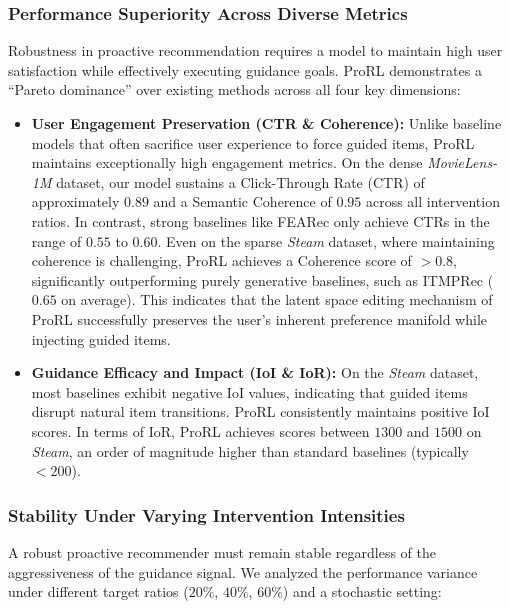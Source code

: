 \subsubsection{Performance Superiority Across Diverse Metrics}
Robustness in proactive recommendation requires a model to maintain high user satisfaction while effectively executing guidance goals. ProRL demonstrates a ``Pareto dominance'' over existing methods across all four key dimensions:

\begin{itemize}
    \item \textbf{User Engagement Preservation (CTR \& Coherence):} 
    Unlike baseline models that often sacrifice user experience to force guided items, ProRL maintains exceptionally high engagement metrics.
    On the dense \textit{MovieLens-1M} dataset, our model sustains a Click-Through Rate (CTR) of approximately $0.89$ and a Semantic Coherence of $0.95$ across all intervention ratios. In contrast, strong baselines like FEARec only achieve CTRs in the range of $ 0.55$ to $0.60$. 
    Even on the sparse \textit{Steam} dataset, where maintaining coherence is challenging, ProRL achieves a Coherence score of $>0.8$, significantly outperforming purely generative baselines, such as ITMPRec ($0.65$ on average). This indicates that the latent space editing mechanism of ProRL successfully preserves the user's inherent preference manifold while injecting guided items.

    \item \textbf{Guidance Efficacy and Impact (IoI \& IoR):} 
    On the \textit{Steam} dataset, most baselines exhibit negative IoI values, indicating that guided items disrupt natural item transitions. ProRL consistently maintains positive IoI scores. In terms of IoR, ProRL achieves scores between $1300$ and $1500$ on \textit{Steam}, an order of magnitude higher than standard baselines (typically $<200$).
\end{itemize}

\subsubsection{Stability Under Varying Intervention Intensities}
A robust proactive recommender must remain stable regardless of the aggressiveness of the guidance signal. We analyzed the performance variance under different target ratios ($20\%$, $40\%$, $60\%$) and a stochastic setting:

